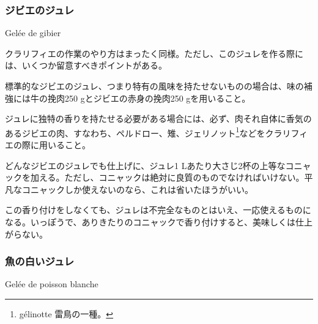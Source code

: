 \begin{recette}
\hypertarget{gelee-de-gibier}{%
\subsubsection{ジビエのジュレ}\label{gelee-de-gibier}}

\begin{frsubenv}

Gelée de gibier

\end{frsubenv}


クラリフィエの作業のやり方はまったく同様。ただし、このジュレを作る際には、いくつか留意すべきポイントがある。

標準的なジビエのジュレ、つまり特有の風味を持たせないものの場合は、味の補強には牛の挽肉250
gとジビエの赤身の挽肉250 gを用いること。

ジュレに独特の香りを持たせる必要がある場合には、必ず、肉それ自体に香気のあるジビエの肉、すなわち、ペルドロー、雉、ジェリノット\footnote{gélinotte
  雷鳥の一種。}などをクラリフィエの際に用いること。

どんなジビエのジュレでも仕上げに、ジュレ1
Lあたり大さじ2杯の上等なコニャックを加える。ただし、コニャックは絶対に良質のものでなければいけない。平凡なコニャックしか使えないのなら、これは省いたほうがいい。

この香り付けをしなくても、ジュレは不完全なものとはいえ、一応使えるものになる。いっぽうで、ありきたりのコニャックで香り付けすると、美味しくは仕上がらない。

\atoaki{}

\hypertarget{gelee-de-poisson-blanche}{%
\subsubsection{魚の白いジュレ}\label{gelee-de-poisson-blanche}}

\begin{frsubenv}

Gelée de poisson blanche

\end{frsubenv}



\end{recette}
